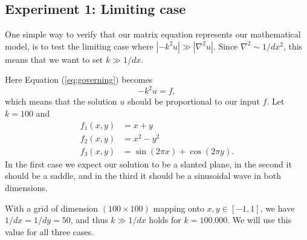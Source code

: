 \documentclass[acmtog]{acmart}
\begin{document}
\subsection{Experiment 1: Limiting case}
One simple way to verify that our matrix equation represents our mathematical
model, is to test the limiting case where $|- k^2 u| \gg |\nabla^2 u|$. Since
$\nabla^2 \sim 1/dx^2$, this means that we want to set $k \gg 1/dx$.

Here Equation (\ref{eq:governing}) becomes
\begin{equation}
  -k^2 u = f,
\end{equation}
which means that the solution $u$ should be proportional to our input $f$.
Let $k = 100$ and
%
\begin{subequations}
  \begin{align}
    f_1(x,y) & = x + y                          \\
    f_2(x,y) & = x^2 - y^2                      \\
    f_3(x,y) & = \sin(2 \pi x) + \cos(2 \pi y).
  \end{align}
\end{subequations}
%
In the first case we expect our solution to be a slanted plane, in the second
it should be a saddle, and in the third it should be a sinusoidal wave in both
dimensions.

With a grid of dimension $(100 \times 100)$ mapping onto $x,y \in [-1, 1]$, we
have $1/dx = 1/dy = 50$, and thus $k \gg 1/dx$ holds for $k = 100.000$. We will
use this value for all three cases.
\end{document}
